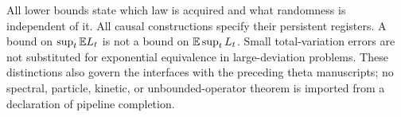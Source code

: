 All lower bounds state which law is acquired and what randomness is
independent of it. All causal constructions specify their persistent
registers. A bound on $\sup_t\mathbb E L_t$ is not a bound on
$\mathbb E\sup_t L_t$. Small total-variation errors are not substituted for
exponential equivalence in large-deviation problems. These distinctions
also govern the interfaces with the preceding theta manuscripts; no
spectral, particle, kinetic, or unbounded-operator theorem is imported
from a declaration of pipeline completion.
